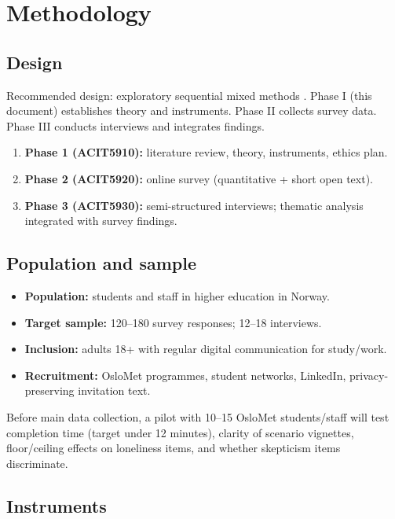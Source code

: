 \documentclass[UKenglish,12pt]{master-style}
\begin{document}
\chapter{Methodology}

\section{Design}

Recommended design: exploratory sequential mixed methods \parencite{braun2006thematic}. Phase I (this document) establishes theory and instruments. Phase II collects survey data. Phase III conducts interviews and integrates findings.

\begin{enumerate}
    \item \textbf{Phase 1 (ACIT5910):} literature review, theory, instruments, ethics plan.
    \item \textbf{Phase 2 (ACIT5920):} online survey (quantitative + short open text).
    \item \textbf{Phase 3 (ACIT5930):} semi-structured interviews; thematic analysis integrated with survey findings.
\end{enumerate}

\section{Population and sample}

\begin{itemize}
    \item \textbf{Population:} students and staff in higher education in Norway.
    \item \textbf{Target sample:} 120--180 survey responses; 12--18 interviews.
    \item \textbf{Inclusion:} adults 18+ with regular digital communication for study/work.
    \item \textbf{Recruitment:} OsloMet programmes, student networks, LinkedIn, privacy-preserving invitation text.
\end{itemize}

Before main data collection, a pilot with 10--15 OsloMet students/staff will test completion time (target under 12 minutes), clarity of scenario vignettes, floor/ceiling effects on loneliness items, and whether skepticism items discriminate.

\section{Instruments}
\end{document}

